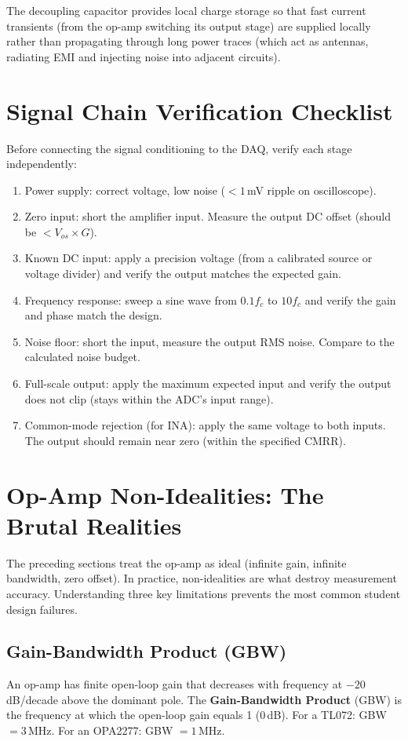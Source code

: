 \documentclass[11pt,letterpaper,twoside,openany]{book}
\begin{document}
The decoupling capacitor provides local charge storage so that fast current transients (from the op-amp switching its output stage) are supplied locally rather than propagating through long power traces (which act as antennas, radiating EMI and injecting noise into adjacent circuits).

\section{Signal Chain Verification Checklist}
Before connecting the signal conditioning to the DAQ, verify each stage independently:

\begin{enumerate}[leftmargin=1.5em]
\item Power supply: correct voltage, low noise ($< 1$\,mV ripple on oscilloscope).
\item Zero input: short the amplifier input. Measure the output DC offset (should be $< V_{os} \times G$).
\item Known DC input: apply a precision voltage (from a calibrated source or voltage divider) and verify the output matches the expected gain.
\item Frequency response: sweep a sine wave from $0.1 f_c$ to $10 f_c$ and verify the gain and phase match the design.
\item Noise floor: short the input, measure the output RMS noise. Compare to the calculated noise budget.
\item Full-scale output: apply the maximum expected input and verify the output does not clip (stays within the ADC's input range).
\item Common-mode rejection (for INA): apply the same voltage to both inputs. The output should remain near zero (within the specified CMRR).
\end{enumerate}
\section{Op-Amp Non-Idealities: The Brutal Realities}
\label{sec:opamp_nonideal}
The preceding sections treat the op-amp as ideal (infinite gain, infinite bandwidth, zero offset). In practice, non-idealities are what destroy measurement accuracy. Understanding three key limitations prevents the most common student design failures.

\subsection{Gain-Bandwidth Product (GBW)}
An op-amp has finite open-loop gain that decreases with frequency at $-20$\,dB/decade above the dominant pole. The \textbf{Gain-Bandwidth Product} (GBW) is the frequency at which the open-loop gain equals 1 (0\,dB). For a TL072: GBW $= 3$\,MHz. For an OPA2277: GBW $= 1$\,MHz.
\end{document}
